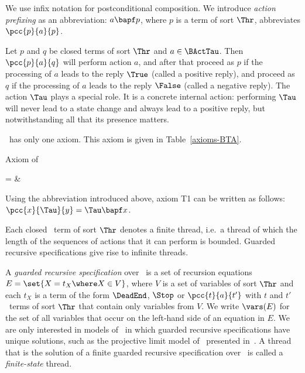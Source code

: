\documentclass[fleqn]{llncs}
\begin{document}
We use infix notation for postconditional composition.
We introduce \emph{action prefixing} as an abbreviation: $a \bapf p$,
where $p$ is a term of sort $\Thr$, abbreviates $\pcc{p}{a}{p}$.

Let $p$ and $q$ be closed terms of sort $\Thr$ and $a \in \BActTau$.
Then $\pcc{p}{a}{q}$ will perform action $a$, and after that proceed as
$p$ if the processing of $a$ leads to the reply $\True$ (called a
positive reply), and proceed as $q$ if the processing of $a$ leads to
the reply $\False$ (called a negative reply).
The action $\Tau$ plays a special role.
It is a concrete internal action: performing $\Tau$ will never lead to a
state change and always lead to a positive reply, but notwithstanding
all that its presence matters.

\BTA\ has only one axiom.
This axiom is given in Table~\ref{axioms-BTA}.\begin{table}[!tb]
\caption{Axiom of \BTA}
\label{axioms-BTA}
\begin{eqntbl}
\begin{axcol}
 =                       & 
\end{axcol}
\end{eqntbl}
\end{table}
Using the abbreviation introduced above, axiom T1 can be written as
follows: $\pcc{x}{\Tau}{y} = \Tau \bapf x$.

Each closed \BTA\ term of sort $\Thr$ denotes a finite thread, i.e.\ a
thread of which the length of the sequences of actions that it can
perform is bounded.
Guarded recursive specifications give rise to infinite threads.

A \emph{guarded recursive specification} over \BTA\ is a set of
recursion equations $E = \set{X = t_X \where X \in V}$, where $V$ is a
set of variables of sort $\Thr$ and each $t_X$ is a term of the form
$\DeadEnd$, $\Stop$ or $\pcc{t}{a}{t'}$ with $t$ and $t'$ \BTA\ terms of
sort $\Thr$ that contain only variables from $V$.
We write $\vars(E)$ for the set of all variables that occur on the
left-hand side of an equation in $E$.
We are only interested in models of \BTA\ in which guarded recursive
specifications have unique solutions, such as the projective limit model
of \BTA\ presented in~\cite{BB03a}.
A thread that is the solution of a finite guarded recursive
specification over \BTA\ is called a \emph{finite-state} thread.
\end{document}
